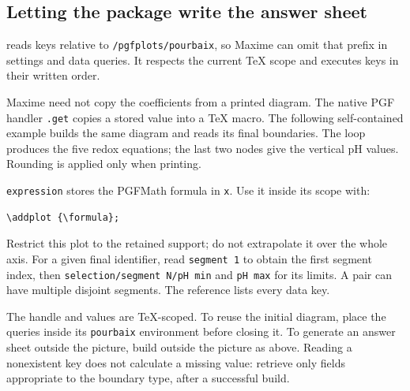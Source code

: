 \documentclass[a4paper,11pt]{ltxdoc}
\begin{document}
\subsection{Letting the package write the answer sheet}
 reads keys relative to \texttt{/pgfplots/pourbaix},
so Maxime can omit that prefix in settings and data queries. It respects the
current TeX scope and executes keys in their written order.

Maxime need not copy the coefficients from a printed diagram. The native PGF
handler \texttt{.get} copies a stored value into a TeX macro. The following
self-contained example builds the same diagram and reads its final boundaries.
The loop produces the five redox equations; the last two nodes give the vertical
pH values. Rounding is applied only when printing.

\begin{codeexample}[width=0pt]
\FeHandle
{}
\end{codeexample}

\texttt{expression} stores the PGFMath formula in \texttt{x}. Use it inside
its scope with:
\begin{verbatim}
\addplot {\formula};
\end{verbatim}
Restrict this plot to the retained support; do not extrapolate it over the
whole axis.
For a given final identifier, read \texttt{segment 1} to obtain the first segment
index, then \texttt{selection/segment N/pH min} and \texttt{pH max} for its limits.
A pair can have multiple disjoint segments. The reference lists every data key.

The handle and values are TeX-scoped. To reuse the initial diagram, place the
queries inside its \texttt{pourbaix} environment before closing it. To generate
an answer sheet outside the picture, build outside the picture as above.
Reading a nonexistent key does not calculate a missing value: retrieve only
fields appropriate to the boundary type, after a successful build.
\end{document}
